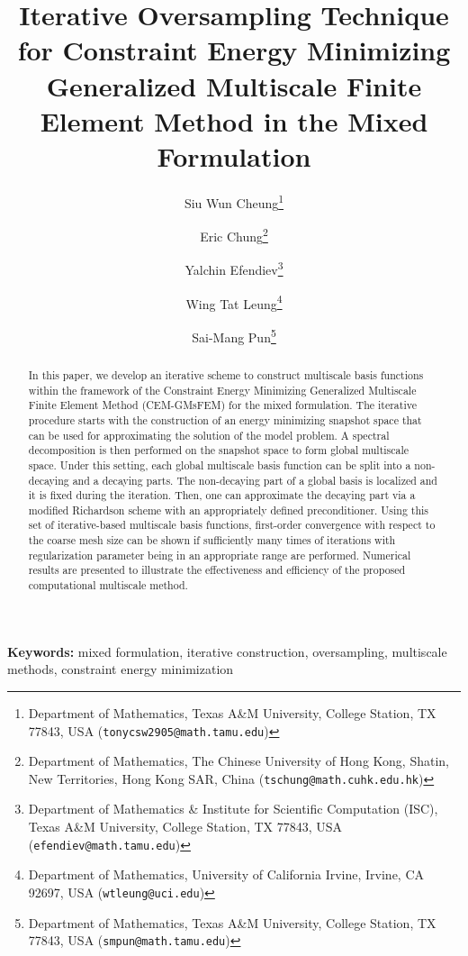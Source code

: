 \documentclass{article}[11pt]
\theoremstyle{definition}
\begin{document}
\title{Iterative Oversampling Technique for Constraint Energy Minimizing Generalized Multiscale Finite Element Method in the Mixed Formulation}
\author{
Siu Wun Cheung\thanks{Department of Mathematics, Texas A\&M University, College Station, TX 77843, USA 
(\texttt{tonycsw2905@math.tamu.edu})}
\and
Eric Chung\thanks{Department of Mathematics, The Chinese University of Hong Kong, Shatin, New Territories, Hong Kong SAR, China 
(\texttt{tschung@math.cuhk.edu.hk})}
\and
Yalchin Efendiev\thanks{Department of Mathematics \& Institute for Scientific Computation (ISC), Texas A\&M University,
College Station, TX 77843, USA (\texttt{efendiev@math.tamu.edu})}
\and
Wing Tat Leung\thanks{Department of Mathematics, 
University of California Irvine, Irvine, CA 92697, USA (\texttt{wtleung@uci.edu})}
\and
Sai-Mang Pun\thanks{Department of Mathematics, Texas A\&M University, College Station, TX 77843, USA 
(\texttt{smpun@math.tamu.edu})}
}

\maketitle

\begin{abstract}
In this paper, we develop an iterative scheme to construct multiscale basis functions within the framework of the Constraint Energy Minimizing Generalized Multiscale Finite Element Method (CEM-GMsFEM) for the mixed formulation. The iterative procedure starts with the construction of an energy minimizing snapshot space that can be used for approximating the solution of the model problem. A spectral decomposition is then performed on the snapshot space to form global multiscale space. Under this setting, each global multiscale basis function can be split into a non-decaying and a decaying parts. The non-decaying part of a global basis is localized and it is fixed during the iteration. Then, one can approximate the decaying part via a modified Richardson scheme with an appropriately defined preconditioner. Using this set of iterative-based multiscale basis functions, first-order convergence with respect to the coarse mesh size can be shown if sufficiently many times of iterations with regularization parameter being in an appropriate range are performed. Numerical results are presented to illustrate the effectiveness and efficiency of the proposed computational multiscale method. 
\end{abstract}

{\bf Keywords:} mixed formulation, iterative construction, oversampling, multiscale methods, constraint energy minimization 
\end{document}
